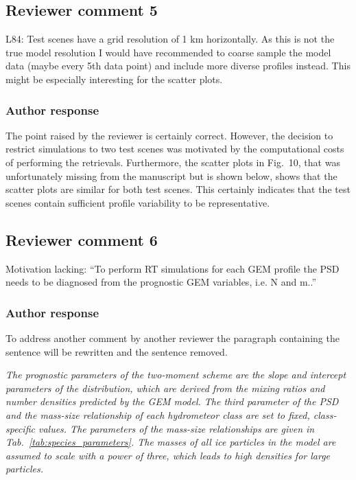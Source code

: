 \documentclass[11pt]{scrartcl}
\begin{document}
\subsection*{Reviewer comment 5}

L84:  Test scenes have a grid resolution of 1 km horizontally.  As this is not the true model resolution I would have recommended to coarse sample the model data (maybe every 5th data point) and include more diverse profiles instead.  This might be especially interesting for the scatter plots.

\subsubsection*{Author response}

The point raised by the reviewer is certainly correct. However, the decision to restrict simulations
to two test scenes was motivated by the computational costs of performing the retrievals. Furthermore,
the scatter plots in Fig.~10, that was unfortunately missing from the manuscript but is shown below,
shows that the scatter plots are similar for both test scenes. This certainly indicates that the
test scenes contain sufficient profile variability to be representative. 



\subsection*{Reviewer comment 6}

Motivation lacking: “To perform RT simulations for each GEM profile the PSD
needs to be diagnosed from the prognostic GEM variables, i.e. N and m..”

\subsubsection*{Author response}

To address another comment by another reviewer the paragraph containing the sentence
will be rewritten and the sentence removed.

{\itshape The prognostic parameters of the two-moment scheme are the slope and
  intercept parameters of the distribution, which are derived from the mixing
  ratios and number densities predicted by the GEM model. The third parameter of
  the PSD and the mass-size relationship of each hydrometeor class are set to
  fixed, class-specific values. The parameters of the mass-size relationships
  are given in Tab.~\ref{tab:species_parameters}. The masses of all ice
  particles in the model are assumed to scale with a power of three, which leads
  to high densities for large particles.}
\end{document}
